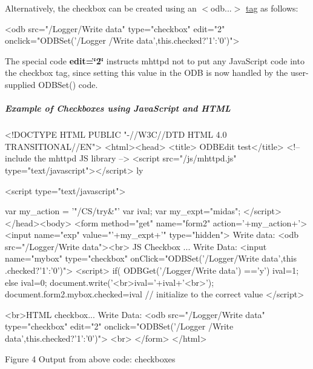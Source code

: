 Alternatively, the checkbox can be created using an  $<$odb...$>$  \hyperlink{RC_mhttpd_custom_ODB_access_RC_mhttpd_custom_odb_html}{tag} as follows: 
\begin{DoxyCode}
  <odb src="/Logger/Write data" type="checkbox" edit="2" onclick="ODBSet('/Logger
      /Write data',this.checked?'1':'0')">
\end{DoxyCode}


The special code {\bfseries edit=\char`\"{}2\char`\"{}} instructs mhttpd not to put any JavaScript code into the checkbox tag, since setting this value in the ODB is now handled by the user-\/supplied ODBSet() code.\hypertarget{RC_mhttpd_custom_ODB_access_features_RC_mhttpd_js_example_3}{}\subparagraph{Example of Checkboxes using JavaScript and HTML}\label{RC_mhttpd_custom_ODB_access_features_RC_mhttpd_js_example_3}

\begin{DoxyCode}
<!DOCTYPE HTML PUBLIC "-//W3C//DTD HTML 4.0 TRANSITIONAL//EN">
<html><head>
<title> ODBEdit test</title>
<!-- include the mhttpd JS library -->
\htmlonly <script src="/js/mhttpd.js" type="text/javascript"></script> \endhtmlon
      ly

\htmlonly <script type="text/javascript">

var my_action = '"/CS/try&"'
var ival;
var my_expt="midas";
</script> \endhtmlonly
</head><body>
<form method="get" name="form2" action='+my_action+'>
<input name="exp" value="'+my_expt+'" type="hidden">
Write data: <odb src="/Logger/Write data"><br>
JS Checkbox ... Write Data:
<input  name="mybox"  type="checkbox"   onClick="ODBSet('/Logger/Write data',this
      .checked?'1':'0')">
\htmlonly <script>
if( ODBGet('/Logger/Write data') =='y')
  ival=1;
else
  ival=0;
document.write('<br>ival='+ival+'<br>');
document.form2.mybox.checked=ival  // initialize to the correct value
</script> \endhtmlonly

<br>HTML checkbox... Write Data:
  <odb src="/Logger/Write data" type="checkbox" edit="2" onclick="ODBSet('/Logger
      /Write data',this.checked?'1':'0')">
<br>
</form>
</html>
\end{DoxyCode}


\par
\par
\par
 \begin{center} Figure 4 Output from above code: checkboxes \par
\par
\par
  \par
\par
\par
 \end{center} 

